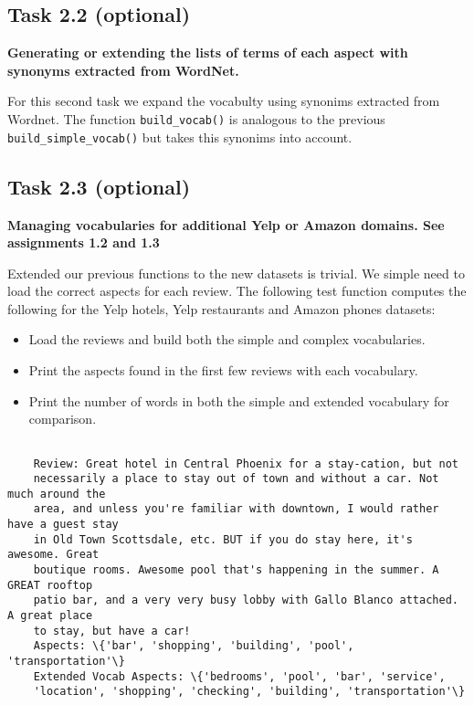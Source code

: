 \documentclass[11pt]{article}
\providecommand{\tightlist}{%
      \setlength{\itemsep}{0pt}\setlength{\parskip}{0pt}}
\begin{document}
\hypertarget{task-2.2-optional}{%
    \subsection{Task 2.2 (optional)}\label{task-2.2-optional}}

\textbf{Generating or extending the lists of terms of each aspect with
    synonyms extracted from WordNet.}

For this second task we expand the vocabulty using synonims extracted
from Wordnet. The function \texttt{build\_vocab()} is analogous to the
previous \texttt{build\_simple\_vocab()} but takes this synonims into
account.

\hypertarget{task-2.3-optional}{%
    \subsection{Task 2.3 (optional)}\label{task-2.3-optional}}

\textbf{Managing vocabularies for additional Yelp or Amazon domains. See
    assignments 1.2 and 1.3}

Extended our previous functions to the new datasets is trivial. We
simple need to load the correct aspects for each review. The following
test function computes the following for the Yelp hotels, Yelp
restaurants and Amazon phones datasets:

\begin{itemize}
    \tightlist
    \item
          Load the reviews and build both the simple and complex vocabularies.
    \item
          Print the aspects found in the first few reviews with each vocabulary.
    \item
          Print the number of words in both the simple and extended vocabulary
          for comparison.
\end{itemize}

\begin{Verbatim}[commandchars=\\\{\}]

    Review: Great hotel in Central Phoenix for a stay-cation, but not
    necessarily a place to stay out of town and without a car. Not much around the
    area, and unless you're familiar with downtown, I would rather have a guest stay
    in Old Town Scottsdale, etc. BUT if you do stay here, it's awesome. Great
    boutique rooms. Awesome pool that's happening in the summer. A GREAT rooftop
    patio bar, and a very very busy lobby with Gallo Blanco attached. A great place
    to stay, but have a car!
    Aspects: \{'bar', 'shopping', 'building', 'pool', 'transportation'\}
    Extended Vocab Aspects: \{'bedrooms', 'pool', 'bar', 'service',
    'location', 'shopping', 'checking', 'building', 'transportation'\}

\end{Verbatim}
\end{document}
